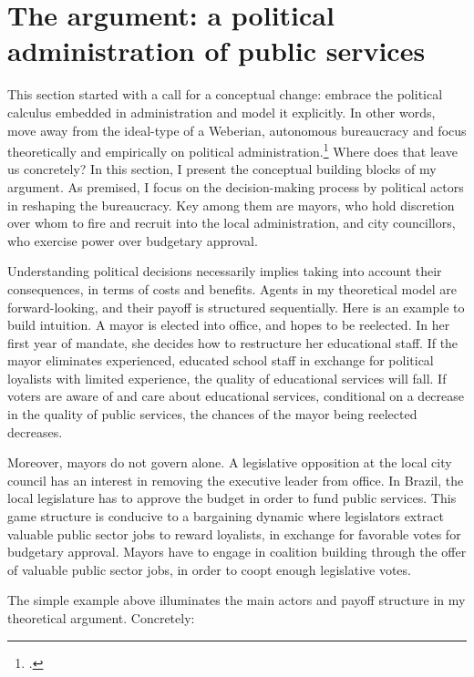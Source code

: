 \documentclass[12pt,]{book}
\let\rmarkdownfootnote\footnote%
\def\footnote{\protect\rmarkdownfootnote}
\begin{document}
\hypertarget{the-argument-a-political-administration-of-public-services}{%
\section{The argument: a political administration of public services}\label{the-argument-a-political-administration-of-public-services}}

This section started with a call for a conceptual change: embrace the political calculus embedded in administration and model it explicitly. In other words, move away from the ideal-type of a Weberian, autonomous bureaucracy and focus theoretically and empirically on political administration.\footnote{\citet{evans_embedded_1995}.} Where does that leave us concretely? In this section, I present the conceptual building blocks of my argument. As premised, I focus on the decision-making process by political actors in reshaping the bureaucracy. Key among them are mayors, who hold discretion over whom to fire and recruit into the local administration, and city councillors, who exercise power over budgetary approval.

Understanding political decisions necessarily implies taking into account their consequences, in terms of costs and benefits. Agents in my theoretical model are forward-looking, and their payoff is structured sequentially. Here is an example to build intuition. A mayor is elected into office, and hopes to be reelected. In her first year of mandate, she decides how to restructure her educational staff. If the mayor eliminates experienced, educated school staff in exchange for political loyalists with limited experience, the quality of educational services will fall. If voters are aware of and care about educational services, conditional on a decrease in the quality of public services, the chances of the mayor being reelected decreases.

Moreover, mayors do not govern alone. A legislative opposition at the local city council has an interest in removing the executive leader from office. In Brazil, the local legislature has to approve the budget in order to fund public services. This game structure is conducive to a bargaining dynamic where legislators extract valuable public sector jobs to reward loyalists, in exchange for favorable votes for budgetary approval. Mayors have to engage in coalition building through the offer of valuable public sector jobs, in order to coopt enough legislative votes.

The simple example above illuminates the main actors and payoff structure in my theoretical argument. Concretely:
\end{document}
